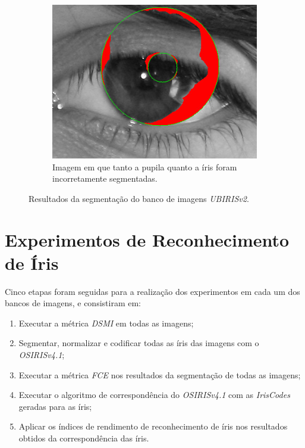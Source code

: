 \begin{figure}[h!]
\begin{subfigure}{.25\textwidth}
\includegraphics[width=\linewidth]{img/Resultados/ubirisv2/ubirisv2_seg_ruim2.jpg}
\caption{Imagem em que tanto a pupila quanto a íris foram incorretamente segmentadas.}
\end{subfigure}
\caption{Resultados da segmentação do banco de imagens \textit{UBIRISv2}.}
\label{fig:experimentos:segmentacoes:ubirisv2}
\end{figure}

\FloatBarrier

\section{Experimentos de Reconhecimento de Íris}\label{sec:experimentos:experimentos}

\par Cinco etapas foram seguidas para a realização dos experimentos em cada um dos bancos de imagens, e consistiram em:

\begin{enumerate}
    \item Executar a métrica \textit{\acrshort{DSMI}} em todas as imagens;
    \item Segmentar, normalizar e codificar todas as íris das imagens com o \textit{OSIRISv4.1};
    \item Executar a métrica \textit{\acrshort{FCE}} nos resultados da segmentação de todas as imagens;
    \item Executar o algoritmo de correspondência do \textit{OSIRISv4.1} com as \textit{IrisCodes} geradas para as íris;
    \item Aplicar os índices de rendimento de reconhecimento de íris nos resultados obtidos da correspondência das íris.
\end{enumerate}


